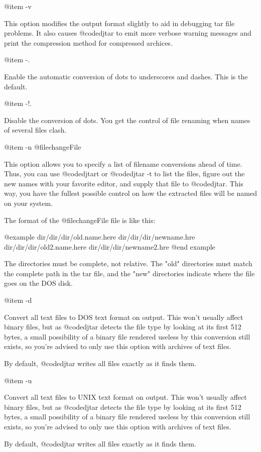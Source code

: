 @item -v

This option modifies the output format slightly to aid in debugging tar
file problems.  It also causes @code{djtar} to emit more verbose warning
messages and print the compression method for compressed archices.

@item -.

Enable the automatic conversion of dots to underscores and dashes.  This
is the default.

@item -!.

Disable the conversion of dots.  You get the control of file renaming when
names of several files clash.

@item -n @file{changeFile}

This option allows you to specify a list of filename conversions ahead of
time.  Thus, you can use @code{djtart} or @code{djtar -t} to list the
files, figure out the new names with your favorite editor, and supply that
file to @code{djtar}.  This way, you have the fullest possible control on
how the extracted files will be named on your system.

The format of the @file{changeFile} file is like this:

@example
dir/dir/dir/old.name.here  dir/dir/dir/newname.hre
dir/dir/dir/old2.name.here  dir/dir/dir/newname2.hre
@end example

The directories must be complete, not relative.  The "old" directories
must match the complete path in the tar file, and the "new" directories
indicate where the file goes on the DOS disk.

@item -d

Convert all text files to DOS text format on output.  This won't usually
affect binary files, but as @code{djtar} detects the file type by looking
at its first 512 bytes, a small possibility of a binary file rendered
useless by this conversion still exists, so you're advised to only use
this option with archives of text files.

By default, @code{djtar} writes all files exactly as it finds them.

@item -u

Convert all text files to UNIX text format on output.  This won't usually
affect binary files, but as @code{djtar} detects the file type by looking
at its first 512 bytes, a small possibility of a binary file rendered
useless by this conversion still exists, so you're advised to only use
this option with archives of text files.

By default, @code{djtar} writes all files exactly as it finds them.

